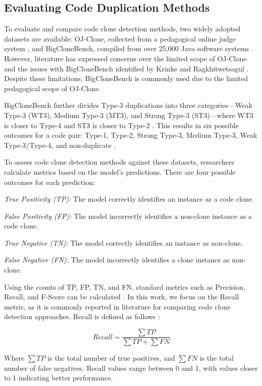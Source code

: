\subsection{Evaluating Code Duplication Methods}

\label{subsec:codemethods}

To evaluate and compare code clone detection methods, two widely adopted
datasets are available: OJ-Clone, collected from a pedagogical online judge
system \citep{ojclone}, and BigCloneBench, compiled from over 25,000 Java
software systems \citep{bigclonebench}. However, literature has expressed
concerns over the limited scope of OJ-Clone and the issues with BigCloneBench
identified by Krinke and Ragkhitwetsagul \citep{bigfail}. Despite these
limitations, BigCloneBench is commonly used due to the limited pedagogical
scope of OJ-Clone.

BigCloneBench further divides Type-3 duplications into three categories—Weak
Type-3 (WT3), Medium Type-3 (MT3), and Strong Type-3 (ST3)—where WT3 is closer
to Type-4 and ST3 is closer to Type-2 \citep{bigclonebench}. This results in
six possible outcomes for a code pair: Type-1, Type-2, Strong Type-3, Medium
Type-3, Weak Type-3/Type-4, and non-duplicate \citep{bigclonebench}.

To assess code clone detection methods against these datasets, researchers
calculate metrics based on the model’s predictions. There are four possible
outcomes for each prediction:

\begin{itemize}
    \begin{item}
        \textit{True Positivity (TP):} The model correctly identifies an instance as a code clone.
    \end{item}
    \begin{item}
        \textit{False Positivity (FP):} The model incorrectly identifies a non-clone instance as a code clone.
    \end{item}
    \begin{item}
        \textit{True Negative (TN):} The model correctly identifies an instance as non-clone.
    \end{item}
    \begin{item}
        \textit{False Negative (FN):} The model incorrectly identifies a clone instance as non-clone.
    \end{item}
\end{itemize}

Using the counts of TP, FP, TN, and FN, standard metrics such as Precision,
Recall, and F-Score can be calculated \citep{recall}. In this work, we focus on
the Recall metric, as it is commonly reported in literature for comparing code
clone detection approaches. Recall is defined as follows \citep{recall}:

$$Recall = \frac{\sum TP}{\sum TP + \sum FN }$$

Where $\sum TP$ is the total number of true positives, and $\sum FN$ is the
total number of false negatives. Recall values range between 0 and 1, with
values closer to 1 indicating better performance.

